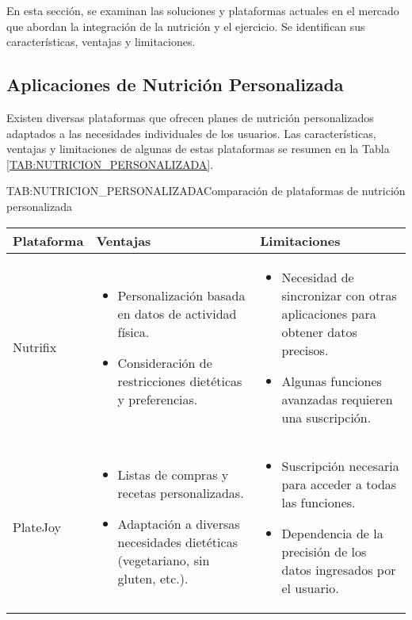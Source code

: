 En esta sección, se examinan las soluciones y plataformas actuales en el mercado que abordan la integración de la nutrición y el ejercicio. Se identifican sus características, ventajas y limitaciones.

\subsection{Aplicaciones de Nutrición Personalizada}

Existen diversas plataformas que ofrecen planes de nutrición personalizados adaptados a las necesidades individuales de los usuarios. Las características, ventajas y limitaciones de algunas de estas plataformas se resumen en la Tabla \ref{TAB:NUTRICION_PERSONALIZADA}.

\begin{table}[Plataformas de Nutrición Personalizada]{TAB:NUTRICION_PERSONALIZADA}{Comparación de plataformas de nutrición personalizada}
  \begin{tabular}{|p{3cm}|p{5cm}|p{5cm}|}
    \hline
    \textbf{Plataforma} & \textbf{Ventajas} & \textbf{Limitaciones} \\
    \hline
    Nutrifix & \begin{itemize}
      \item Personalización basada en datos de actividad física.
      \item Consideración de restricciones dietéticas y preferencias.
    \end{itemize} & \begin{itemize}
      \item Necesidad de sincronizar con otras aplicaciones para obtener datos precisos.
      \item Algunas funciones avanzadas requieren una suscripción.
    \end{itemize} \\
    \hline
    PlateJoy & \begin{itemize}
      \item Listas de compras y recetas personalizadas.
      \item Adaptación a diversas necesidades dietéticas (vegetariano, sin gluten, etc.).
    \end{itemize} & \begin{itemize}
      \item Suscripción necesaria para acceder a todas las funciones.
      \item Dependencia de la precisión de los datos ingresados por el usuario.
    \end{itemize} \\
    \hline
  \end{tabular}
\end{table}

